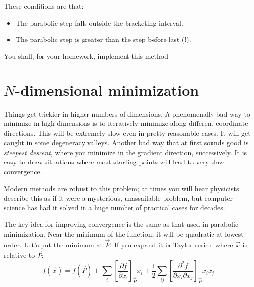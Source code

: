 These conditions are that:
\begin{itemize}
\item The parabolic step falls outside the  bracketing interval.
\item The parabolic step is greater than the step before last (!).
\end{itemize}

You shall, for your homework, implement this method.

\section{$N$-dimensional minimization}

Things get trickier in higher numbers of dimensions. A phenomenally
bad way to minimize in high dimensions is to iteratively minimize
along different coordinate directions.  This will be extremely slow
even in pretty reasonable cases.  It will get caught in some
degeneracy valleys.  Another bad way that at first sounds good is {\it
  steepest descent}, where you minimize in the gradient direction,
successively. It is easy to draw situations where most starting
points will lead to very slow convergence.

Modern methods are robust to this problem; at times you will hear
physicists describe this as if it were a mysterious, unassailable
problem, but computer science has had it solved in a huge number of
practical cases for decades.

The key idea for improving convergence is the same as that used in
parabolic minimization. Near the minimum of the function, it will be
quadratic at lowest order. Let's put the minimum at $\vec{P}$.  If you
expand it in Taylor series, where $\vec{x}$ is relative to $\vec{P}$:
\begin{equation}
  f(\vec{x}) = f(\vec{P})
  + \sum_i \left[\frac{\partial f}{\partial x_i}\right]_{\vec{P}}  x_i
  + \frac{1}{2} \sum_{ij} \left[\frac{\partial^2 f}{\partial x_i \partial x_j}\right]_{\vec{P}}
  x_i x_j
\end{equation}


